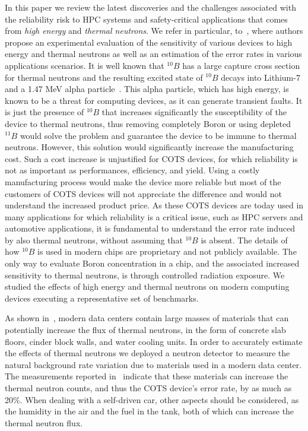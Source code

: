 In this paper we review the latest discoveries and the challenges associated with the reliability risk to HPC systems and safety-critical applications that comes from \textit{high energy} and \textit{thermal neutrons}. We refer in particular, to~\cite{ets2020, jsc2020}, where authors propose an experimental evaluation of the sensitivity of various devices to high energy and thermal neutrons as well as an estimation of the error rates in various applications scenarios.
It is well known that $^{10}B$ has a large capture cross section for thermal neutrons and the resulting excited state of $^{10}B$ decays into Lithium-7 and a 1.47 MeV alpha particle~\cite{ziegler2004ser, Baumann2005}. This alpha particle, which has high energy, is known to be a threat for computing devices, as it can generate transient faults. It is just the presence of $^{10}B$ that increases significantly the susceptibility of the device to thermal neutrons, thus removing completely Boron or using depleted $^{11}B$ would solve the problem and guarantee the device to be immune to thermal neutrons. However, this solution would significantly increase the manufacturing cost. Such a cost increase is unjustified for COTS devices, for which reliability is not as important as performances, efficiency, and yield. Using a costly manufacturing process would make the device more reliable but most of the customers of COTS devices will not appreciate the difference and would not understand the increased product price. As these COTS devices are today used in many applications for which reliability is a critical issue, such as HPC servers and automotive applications, it is fundamental to understand the error rate induced by also thermal neutrons, without assuming that $^{10}B$ is absent. The details of how  $^{10}B$ is used in modern chips are proprietary and not publicly available. The only way to evaluate Boron concentration in a chip, and the associated increased sensitivity to thermal neutrons, is through controlled radiation exposure. We studied the effects of high energy and thermal neutrons on modern computing devices executing a representative set of benchmarks.

As shown in~\cite{jsc2020}, modern data centers contain large masses of materials that can potentially increase the flux of thermal neutrons, in the form of concrete slab floors, cinder block walls, and water cooling units. In order to accurately estimate the effects of thermal neutrons we deployed a neutron detector to measure the natural background rate variation due to materials used in a modern data center. The measurements reported in~\cite{jsc2020} indicate that these materials  can increase the thermal neutron counts, and thus the COTS device's error rate, by as much as 20\%. When dealing with a self-driven car, other aspects should be considered, as the humidity in the air and the fuel in the tank, both of which can increase the thermal neutron flux.

